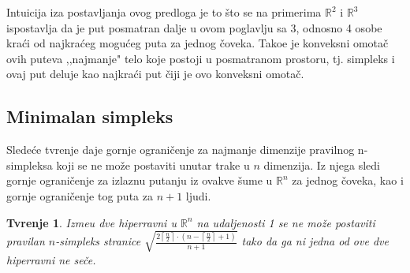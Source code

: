 \documentclass[11pt,letter]{article}
\newtheorem{tvr}[teo]{\bf Tvr\dj enje}
\begin{document}
\indent Intuicija iza postavljanja ovog predloga je to \v sto se na primerima $\mathbb{R}^2$ i $\mathbb{R}^3$ ispostavlja da je put posmatran dalje u ovom poglavlju sa 3, odnosno 4 osobe kra\' ci od najkra\' ceg mogu\' ceg puta za jednog \v coveka. Tako\dj e je konveksni omota\v c ovih puteva ,,najmanje" telo koje postoji u posmatranom prostoru, tj. simpleks i ovaj put deluje kao najkra\' ci put \v ciji je ovo konveksni omota\v c.


\smallskip
\subsection[Minimalan simpleks]{Minimalan simpleks}
\bigskip

\indent Slede\' ce tvr\dj enje daje gornje ograni\v cenje za najmanje dimenzije pravilnog n-simpleksa koji se ne mo\v ze postaviti unutar trake u $n$ dimenzija. Iz njega sledi gornje ograni\v cenje za izlaznu putanju iz ovakve \v sume u $\mathbb{R}^n$ za jednog \v coveka, kao i gornje ograni\v cenje tog puta za $n+1$ ljudi. 
\smallskip

\begin{tvr} Izme\dj u dve hiperravni u $\mathbb{R}^n$ na udaljenosti 1 se ne mo\v ze postaviti pravilan $n$-simpleks stranice $\sqrt{\frac{2\left\lceil \frac{n}{2}\right\rceil\cdot \left( n-\left\lceil\frac{n}{2}\right\rceil+1\right)}{n+1}}$ tako da ga ni jedna od ove dve hiperravni ne se\v ce.
\end{tvr}
\end{document}
